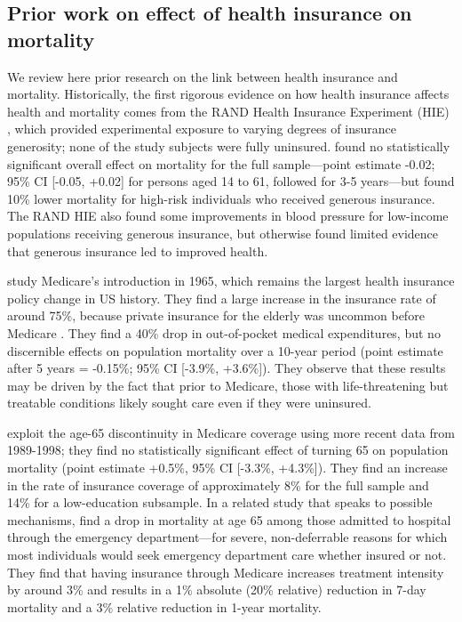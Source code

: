 \documentclass[12pt]{article}%
\begin{document}
\subsection{Prior work on effect of health insurance on mortality}

We review here prior research on the link between health insurance and mortality.  
Historically, the first rigorous evidence on how health insurance affects health and mortality comes from the RAND Health Insurance Experiment (HIE) \citep{brookDoesFreeCare1983,keelerHowFreeCare1985,newhouseFreeAllLessons1993}, which provided experimental exposure to varying degrees of insurance generosity; none of the study subjects were fully uninsured. 
\citet{brookDoesFreeCare1983} found no statistically significant overall effect on mortality for the full sample---point estimate -0.02; 95\% CI [-0.05, +0.02] for persons aged 14 to 61, followed for 3-5 years---but found 10\% lower mortality for high-risk individuals who received generous insurance. 
The RAND HIE also found some improvements in blood pressure for low-income populations receiving generous insurance, but otherwise found limited evidence that generous insurance led to improved health. 

\citet{finkelsteinWhatDidMedicare2008} study Medicare’s introduction in 1965, which remains the largest health insurance policy change in US history. 
They find a large increase in the insurance rate of around 75\%, because private insurance for the elderly was uncommon before Medicare \citep{finkelsteinAggregateEffectsHealth2007}. 
They find a 40\% drop in out-of-pocket medical expenditures, but no discernible effects on population mortality over a 10-year period (point estimate after 5 years = -0.15\%; 95\% CI [-3.9\%, +3.6\%]). 
They observe that these results may be driven by the fact that prior to Medicare, those with life-threatening but treatable conditions likely sought care even if they were uninsured. 

\citet{cardImpactNearlyUniversal2004} exploit the age-65 discontinuity in Medicare coverage using more recent data from 1989-1998; they find no statistically significant effect of turning 65 on population mortality (point estimate +0.5\%, 95\% CI [-3.3\%, +4.3\%]). 
They find an increase in the rate of insurance coverage of  approximately 8\% for the full sample %
 and 14\% for a low-education subsample. 
In a related study that speaks to possible mechanisms, \citet{cardDoesMedicareLives2009} find a drop in mortality at age 65 among those admitted to hospital through the emergency department---for severe, non-deferrable reasons for which most individuals would seek emergency department care whether insured or not. 
They find that having insurance through Medicare increases treatment intensity by around 3\% and results in a 1\% absolute (20\% relative) reduction in 7-day mortality and a 3\% relative reduction in 1-year mortality.
\end{document}
